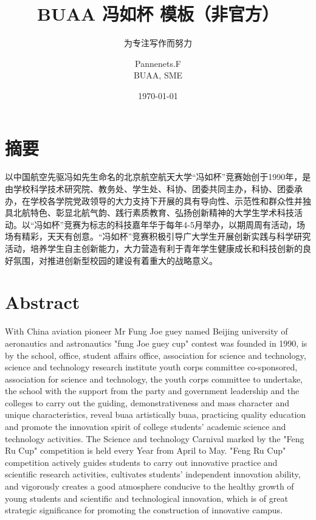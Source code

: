 \documentclass[lang=cn,12pt]{frbpaper}
\title{BUAA 冯如杯 \hologo{LaTeX} 模板（非官方）}
\subtitle{为专注写作而努力}
\author{\Large Pannenets.F \\  \Large{BUAA, SME}}
\date{\today}
\begin{document}
\maketitle


\makeabstract

\section*{摘要}
以中国航空先驱冯如先生命名的北京航空航天大学“冯如杯”竞赛始创于1990年，是由学校科学技术研究院、教务处、学生处、科协、团委共同主办，科协、团委承办，在学校各学院党政领导的大力支持下开展的具有导向性、示范性和群众性并独具北航特色、彰显北航气韵、践行素质教育、弘扬创新精神的大学生学术科技活动。以“冯如杯”竞赛为标志的科技嘉年华于每年4-5月举办，以期周周有活动，场场有精彩，天天有创意。“冯如杯”竞赛积极引导广大学生开展创新实践与科学研究活动，培养学生自主创新能力，大力营造有利于青年学生健康成长和科技创新的良好氛围，对推进创新型校园的建设有着重大的战略意义。

\clearpage


\section*{Abstract}
With China aviation pioneer Mr Fung Joe guey named Beijing university of aeronautics and astronautics "fung Joe guey cup" contest was founded in 1990, is by the school, office, student affairs office, association for science and technology, science and technology research institute youth corps committee co-sponsored, association for science and technology, the youth corps committee to undertake, the school with the support from the party and government leadership and the colleges to carry out the guiding, demonstrativeness and mass character and unique characteristics, reveal buaa artistically buaa, practicing quality education and promote the innovation spirit of college students' academic science and technology activities. The Science and technology Carnival marked by the "Feng Ru Cup" competition is held every Year from April to May. "Feng Ru Cup" competition actively guides students to carry out innovative practice and scientific research activities, cultivates students' independent innovation ability, and vigorously creates a good atmosphere conducive to the healthy growth of young students and scientific and technological innovation, which is of great strategic significance for promoting the construction of innovative campus.
\end{document}
